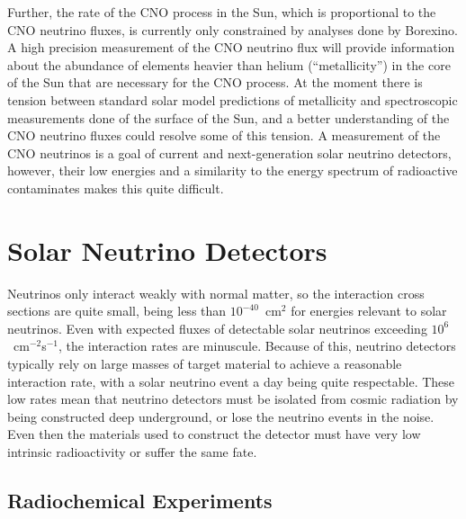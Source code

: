 Further, the rate of the CNO process in the Sun, which is proportional to the CNO neutrino fluxes, is currently only constrained by analyses done by Borexino.
A high precision measurement of the CNO neutrino flux will provide information about the abundance of elements heavier than helium (``metallicity'') in the core of the Sun that are necessary for the CNO process.
At the moment there is tension between standard solar model predictions of metallicity and spectroscopic measurements done of the surface of the Sun, and a better understanding of the CNO neutrino fluxes could resolve some of this tension.
A measurement of the CNO neutrinos is a goal of current and next-generation solar neutrino detectors, however, their low energies and a similarity to the energy spectrum of radioactive contaminates makes this quite difficult.

\clearpage

\chapter{Solar Neutrino Detectors}
\label{ch:detectors}

Neutrinos only interact weakly with normal matter, so the interaction cross sections are quite small, being less than $10^{-40}$~cm$^2$ for energies relevant to solar neutrinos.
Even with expected fluxes of detectable solar neutrinos exceeding $10^6$~cm$^{-2}$s$^{-1}$, the interaction rates are minuscule.
Because of this, neutrino detectors typically rely on large masses of target material to achieve a reasonable interaction rate, with a solar neutrino event a day being quite respectable.
These low rates mean that neutrino detectors must be isolated from cosmic radiation by being constructed deep underground, or lose the neutrino events in the noise.
Even then the materials used to construct the detector must have very low intrinsic radioactivity or suffer the same fate.

\section{Radiochemical Experiments}

